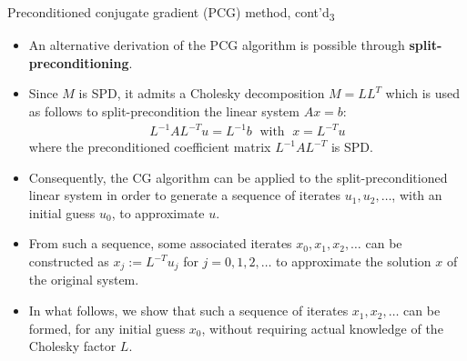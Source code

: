 \documentclass[t,usepdftitle=false]{beamer}
\begin{document}
\begin{frame}{Preconditioned conjugate gradient (PCG) method, cont'd\textsubscript{3}}
\begin{itemize}
\item An alternative derivation of the PCG algorithm is possible through \textbf{split-preconditioning}.
\item Since $M$ is SPD, it admits a Cholesky decomposition $M=LL^T$ which is used as follows to split-precondition the linear system $Ax=b$:
\begin{align*}
L^{-1}AL^{-T}u=L^{-1}b
\;\text{ with }\;
x=L^{-T}u
\end{align*}
where the preconditioned coefficient matrix $L^{-1}AL^{-T}$ is SPD.
\item[] Consequently, the CG algorithm can be applied to the split-preconditioned linear system in order to generate a sequence of iterates $u_1,u_2,\dots$, with an initial guess $u_0$, to approximate $u$.
\item[] From such a sequence, some associated iterates $x_0,x_1,x_2,\dots$ can be constructed as $x_j:=L^{-T}u_j$ for $j=0,1,2,\dots$ to approximate the solution $x$ of the original system.
\item In what follows, we show that such a sequence of iterates $x_1,x_2,\dots$ can be formed, for any initial guess $x_0$, without requiring actual knowledge of the Cholesky factor $L$.
\end{itemize}
\end{frame}
\end{document}
